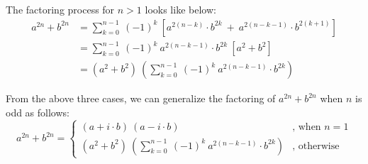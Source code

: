 \documentclass[12pt]{article}
\begin{document}
The factoring process for $n > 1$ looks like below:
\begin{equation*}
	\begin{aligned}
	a^{2n}+b^{2n} &= \sum_{k=0}^{n-1}\ (-1)^k\ \left[ a^{2(n-k)} \cdot b^{2k}\ +\ a^{2(n-k-1)}\cdot b^{2(k+1)} \right]\\
				  &= \sum_{k=0}^{n-1}\ (-1)^k\ a^{2(n-k-1)}\cdot b^{2k}\ \left[ a^2+b^2 \right]\\
				  &= \left( a^2+b^2 \right)\ \left( \sum_{k=0}^{n-1}\ (-1)^k\ a^{2(n-k-1)}\cdot b^{2k} \right)
	\end{aligned}
\end{equation*}

From the above three cases, we can generalize the factoring of $a^{2n}+b^{2n}$ when $n$ is odd as follows:
\[
a^{2n}+b^{2n} = \begin{cases} (a+i\cdot b)\ (a-i\cdot b) &\mbox{, when } n=1\\ \left( a^2+b^2 \right)\ \left( \sum_{k=0}^{n-1}\ (-1)^k\ a^{2(n-k-1)}\cdot b^{2k} \right) & \mbox{, otherwise} \end{cases}
\]

\end{document}
